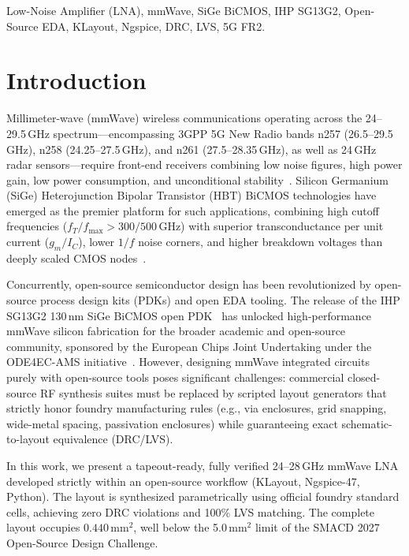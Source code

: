 \documentclass[conference]{IEEEtran}
\begin{document}
\begin{IEEEkeywords}
Low-Noise Amplifier (LNA), mmWave, SiGe BiCMOS, IHP SG13G2, Open-Source EDA, KLayout, Ngspice, DRC, LVS, 5G FR2.
\end{IEEEkeywords}

\section{Introduction}
Millimeter-wave (mmWave) wireless communications operating across the 24--29.5\,GHz spectrum—encompassing 3GPP 5G New Radio bands n257 (26.5--29.5\,GHz), n258 (24.25--27.5\,GHz), and n261 (27.5--28.35\,GHz), as well as 24\,GHz radar sensors—require front-end receivers combining low noise figures, high power gain, low power consumption, and unconditional stability~\cite{razavi_rf, niknejad_mmwave}. Silicon Germanium (SiGe) Heterojunction Bipolar Transistor (HBT) BiCMOS technologies have emerged as the premier platform for such applications, combining high cutoff frequencies ($f_T/f_{\max} > 300/500$\,GHz) with superior transconductance per unit current ($g_m/I_C$), lower $1/f$ noise corners, and higher breakdown voltages than deeply scaled CMOS nodes~\cite{cressler_sige}.

Concurrently, open-source semiconductor design has been revolutionized by open-source process design kits (PDKs) and open EDA tooling. The release of the IHP SG13G2 130\,nm SiGe BiCMOS open PDK~\cite{ihp_pdk} has unlocked high-performance mmWave silicon fabrication for the broader academic and open-source community, sponsored by the European Chips Joint Undertaking under the ODE4EC-AMS initiative~\cite{ode4ec}. However, designing mmWave integrated circuits purely with open-source tools poses significant challenges: commercial closed-source RF synthesis suites must be replaced by scripted layout generators that strictly honor foundry manufacturing rules (e.g., via enclosures, grid snapping, wide-metal spacing, passivation enclosures) while guaranteeing exact schematic-to-layout equivalence (DRC/LVS).

In this work, we present a tapeout-ready, fully verified 24--28\,GHz mmWave LNA developed strictly within an open-source workflow (KLayout, Ngspice-47, Python). The layout is synthesized parametrically using official foundry standard cells, achieving zero DRC violations and 100\% LVS matching. The complete layout occupies $0.440\,\text{mm}^2$, well below the 5.0\,$\text{mm}^2$ limit of the SMACD 2027 Open-Source Design Challenge.
\end{document}
